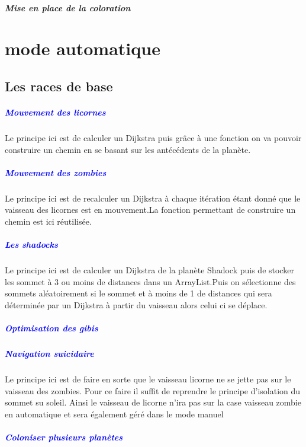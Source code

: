 \documentclass{report}
\begin{document}
			
			\paragraph{Mise en place de la coloration}
			
			
	\chapter{mode automatique}
		\section{Les races de base}
			\paragraph{\textcolor{blue}{Mouvement des licornes}}
			Le principe ici est de calculer un Dijkstra puis grâce à une fonction on va pouvoir construire un chemin en se basant sur les antécédents de la planète.
			\paragraph{\textcolor{blue}{Mouvement des zombies}}
			Le principe ici est de recalculer un Dijkstra à chaque itération étant donné que le vaisseau des licornes est en mouvement.La fonction permettant de construire un chemin est ici réutilisée.
			\paragraph{\textcolor{blue}{Les shadocks}}
			Le principe ici est de calculer un Dijkstra de la planète Shadock puis de stocker les sommet à 3 ou moins de distances dans un ArrayList.Puis on sélectionne des sommets aléatoirement si le sommet et à moins de 1 de distances qui sera déterminée par un Dijkstra à partir du vaisseau alors celui ci se déplace.
			\paragraph{\textcolor{blue}{Optimisation des gibis}}
			\paragraph{\textcolor{blue}{Navigation suicidaire}}
			Le principe ici est de faire en sorte que le vaisseau licorne ne se jette pas sur le vaisseau des zombies.
			Pour ce faire il suffit de reprendre le principe d'isolation du sommet su soleil.
			Ainsi le vaisseau de licorne n'ira pas sur la case vaisseau zombie en automatique et sera également géré dans le mode manuel
			\paragraph{\textcolor{blue}{Coloniser plusieurs planètes}}
	\setcounter{tocdepth}{4}
	\tableofcontents
\end{document}
